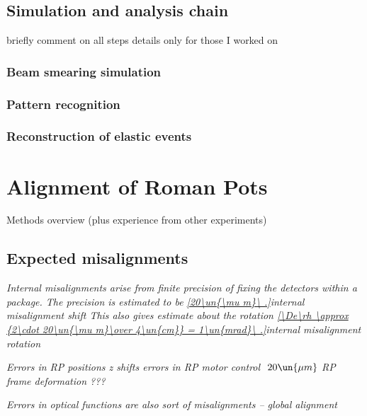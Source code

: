 \section{Simulation and analysis chain}


\> briefly comment on all steps
\> details only for those I worked on

\subsection{Beam smearing simulation}

\subsection{Pattern recognition}

\subsection{Reconstruction of elastic events}



\chapter[alignment]{Alignment of Roman Pots}

\> Methods overview (plus experience from other experiments)

\section[expected misalignments]{Expected misalignments}

\noindent\em{Internal misalignments} arise from finite precision of fixing the detectors within a package. The precision is estimated to be
\eqref{20\un{\mu m}\ .}{internal misalignment shift}
This also gives estimate about the rotation
\eqref{\De\rh \approx {2\cdot 20\un{\mu m}\over 4\un{cm}} = 1\un{mrad}\ .}{internal misalignment rotation}

\noindent\em{Errors in RP positions}
\> z shifts
\> errors in RP motor control $~20\un{\mu m}$
\> RP frame deformation ???

\noindent\em{Errors in optical functions} are also sort of misalignments -- global alignment

